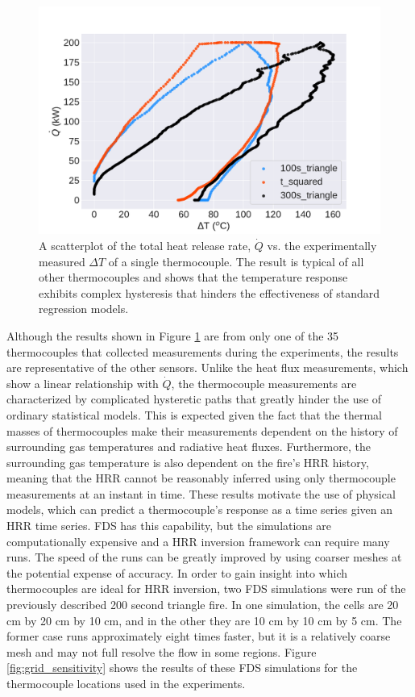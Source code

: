 \documentclass{article}
\begin{document}
\begin{figure}[htb] \centering
\includegraphics[width=.75\textwidth]{./figures/temp_scatter.pdf}
\caption{A scatterplot of the total heat release rate, $\dot{Q}$ vs. the experimentally measured $\Delta T$ of a single thermocouple. The result is typical of all other thermocouples and shows that the temperature response exhibits complex hysteresis that hinders the effectiveness of standard regression models. }
\label{fig:temp_scatter}
\end{figure}

Although the results shown in Figure \ref{fig:temp_scatter} are from only one of the 35 thermocouples that collected measurements during the experiments, the results are representative of the other sensors. Unlike the heat flux measurements, which show a linear relationship with $\dot{Q}$, the thermocouple measurements are characterized by complicated hysteretic paths that greatly hinder the use of ordinary statistical models. This is expected given the fact that the thermal masses of thermocouples make their measurements dependent on the history of surrounding gas temperatures and radiative heat fluxes. Furthermore, the surrounding gas temperature is also dependent on the fire's HRR history, meaning that the HRR cannot be reasonably inferred using only thermocouple measurements at an instant in time. These results motivate the use of physical models, which can predict a thermocouple's response as a time series given an HRR time series. FDS has this capability, but the simulations are computationally expensive and a HRR inversion framework can require many runs. The speed of the runs can be greatly improved by using coarser meshes at the potential expense of accuracy. In order to gain insight into which thermocouples are ideal for HRR inversion, two FDS simulations were run of the previously described 200 second triangle fire. In one simulation, the cells are 20 cm by 20 cm by 10 cm, and in the other they are 10 cm by 10 cm by 5 cm. The former case runs approximately eight times faster, but it is a relatively coarse mesh and may not full resolve the flow in some regions. Figure \ref{fig:grid_sensitivity} shows the results of these FDS simulations for the thermocouple locations used in the experiments.
\end{document}
